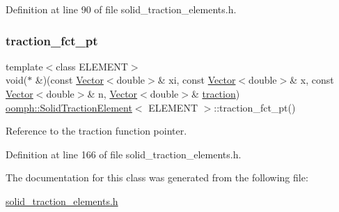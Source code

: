Definition at line 90 of file solid\+\_\+traction\+\_\+elements.\+h.

\mbox{\label{classoomph_1_1SolidTractionElement_a1ed29876e72ccd4ee0ed41f74bd1470b}} 
\subsubsection{\texorpdfstring{traction\+\_\+fct\+\_\+pt}{traction\_fct\_pt}}
{\footnotesize\ttfamily template$<$class E\+L\+E\+M\+E\+NT$>$ \\
void($\ast$ \&)(const \hyperlink{classoomph_1_1Vector}{Vector}$<$double$>$\& xi, const \hyperlink{classoomph_1_1Vector}{Vector}$<$double$>$\& x, const \hyperlink{classoomph_1_1Vector}{Vector}$<$double$>$\& n, \hyperlink{classoomph_1_1Vector}{Vector}$<$double$>$\& \hyperlink{classoomph_1_1SolidTractionElement_ab00a3429962eb33612054e82095f8082}{traction}) \hyperlink{classoomph_1_1SolidTractionElement}{oomph\+::\+Solid\+Traction\+Element}$<$ E\+L\+E\+M\+E\+NT $>$\+::traction\+\_\+fct\+\_\+pt()\hspace{0.3cm}{\ttfamily [inline]}}



Reference to the traction function pointer. 



Definition at line 166 of file solid\+\_\+traction\+\_\+elements.\+h.



The documentation for this class was generated from the following file\+:\begin{DoxyCompactItemize}
\item 
\hyperlink{solid__traction__elements_8h}{solid\+\_\+traction\+\_\+elements.\+h}\end{DoxyCompactItemize}
